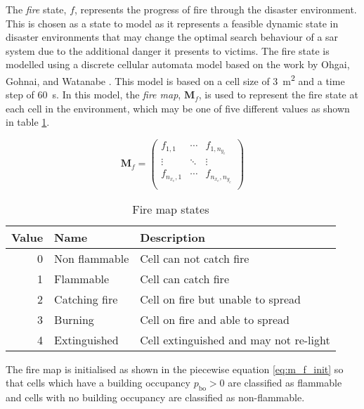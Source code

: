 \documentclass[conference]{IEEEtran}
\begin{document}
The \textit{fire} state, $f$, represents the progress of fire through the disaster environment.
This is chosen as a state to model as it represents a feasible dynamic state in disaster environments that may change the optimal search behaviour of a \gls{sar} system due to the additional danger it presents to victims.
The fire state is modelled using a discrete cellular automata model based on the work by Ohgai, Gohnai, and Watanabe \cite{ohgai2007cellular}.
This model is based on a cell size of \SI{3}{\meter \squared} and a time step of \SI{60}{\second}.
In this model, the \textit{fire map}, $\bm{M}_{f}$, is used to represent the fire state at each cell in the environment, which may be one of five different values as shown in table \ref{tab:m_f_states}.

\begin{equation} \label{eq:m_f}
\bm{M}_{f} = 
    \begin{pmatrix}
        f_{1,1} & \cdots & f_{1,n_{y_{e}}}\\
        \vdots & \ddots & \vdots \\
        f_{n_{x_{e}},1}& \cdots & f_{n_{x_{e}},n_{y_{e}}}\\
    \end{pmatrix}
\end{equation}

\begin{table}[]
    \centering
    \caption{Fire map states}
    \label{tab:m_f_states}
    \begin{tabular}{r|ll}
        \toprule
        Value   & Name              & Description           \\
        \midrule
        0       & Non flammable     & Cell can not catch fire    \\
        1       & Flammable         & Cell can catch fire        \\
        2       & Catching fire     & Cell on fire but unable to spread    \\
        3       & Burning           & Cell on fire and able to spread        \\
        4       & Extinguished      & Cell extinguished and may not re-light      \\
        \bottomrule
    \end{tabular}
\end{table}

The fire map is initialised as shown in the piecewise equation \ref{eq:m_f_init} so that cells which have a building occupancy $p_{\text{bo}} > 0$ are classified as flammable and cells with no building occupancy are classified as non-flammable.
\end{document}
